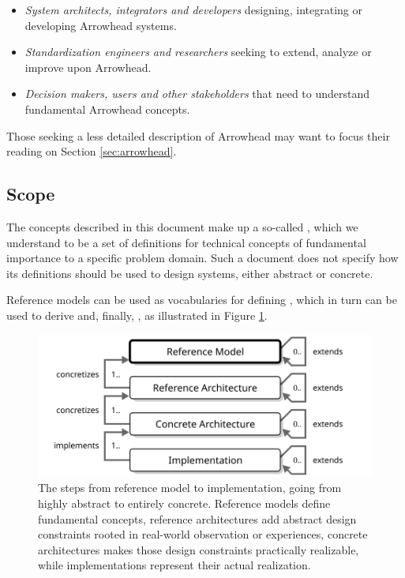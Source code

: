 \begin{itemize}
\item \textit{System architects, integrators and developers} designing, integrating or developing Arrowhead systems.
\item \textit{Standardization engineers and researchers} seeking to extend, analyze or improve upon Arrowhead.
\item \textit{Decision makers, users and other stakeholders} that need to understand fundamental Arrowhead concepts.
\end{itemize}

Those seeking a less detailed description of Arrowhead may want to focus their reading on Section \ref{sec:arrowhead}.

\subsection{Scope}
\label{sec:introduction:scope}

The concepts described in this document make up a so-called , which we understand to be a set of definitions for technical concepts of fundamental importance to a specific problem domain.
Such a document does not specify how its definitions should be used to design systems, either abstract or concrete.

Reference models can be used as vocabularies for defining , which in turn can be used to derive  and, finally, , as illustrated in Figure \ref{fig:reference-model}.

\begin{figure}[ht]
  \centering
  \includegraphics{figures/reference-model}
  \caption{
    The steps from reference model to implementation, going from highly abstract to entirely concrete.
    Reference models define fundamental concepts, reference architectures add abstract design constraints rooted in real-world observation or experiences, concrete architectures makes those design constraints practically realizable, while implementations represent their actual realization.
  }
  \label{fig:reference-model}
\end{figure}

